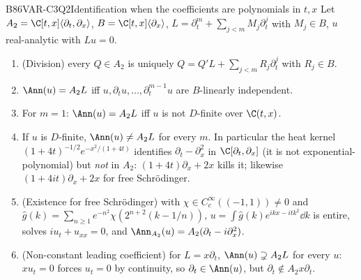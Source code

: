 \begin{dimcard}{B86}{VAR-C3Q2}{Identification when the coefficients are polynomials in $t,x$}{\proved}{}
Let $A_2=\C[t,x]\langle\partial_t,\partial_x\rangle$, $B=\C[t,x]\langle\partial_x\rangle$, $L=\partial_t^m+\sum_{j<m}M_j\partial_t^j$ with $M_j\in B$, $u$ real-analytic with $Lu=0$.
\begin{enumerate}[label=(\alph*)]
\item (Division) every $Q\in A_2$ is uniquely $Q=Q'L+\sum_{j<m}R_j\partial_t^j$ with $R_j\in B$.
\item $\Ann(u)=A_2L$ iff $u,\partial_tu,\dots,\partial_t^{m-1}u$ are $B$-linearly independent.
\item For $m=1$: $\Ann(u)=A_2L$ iff $u$ is not $D$-finite over $\C(t,x)$.
\item If $u$ is $D$-finite, $\Ann(u)\ne A_2L$ for every $m$. In particular the heat kernel $(1+4t)^{-1/2}e^{-x^2/(1+4t)}$ identifies $\partial_t-\partial_x^2$ in $\C[\partial_t,\partial_x]$ (it is not exponential-polynomial) but \emph{not} in $A_2$: $(1+4t)\partial_x+2x$ kills it; likewise $(1+4it)\partial_x+2x$ for free Schr\"odinger.
\item (Existence for free Schr\"odinger) with $\chi\in C_c^\infty((-1,1))\ne0$ and $\hat g(k)=\sum_{n\ge1}e^{-n^2}\chi(2^{n+2}(k-1/n))$, $u=\int\hat g(k)e^{ikx-itk^2}\dd k$ is entire, solves $iu_t+u_{xx}=0$, and $\Ann_{A_2}(u)=A_2(\partial_t-i\partial_x^2)$.
\item (Non-constant leading coefficient) for $L=x\partial_t$, $\Ann(u)\supsetneq A_2L$ for every $u$: $xu_t=0$ forces $u_t=0$ by continuity, so $\partial_t\in\Ann(u)$, but $\partial_t\notin A_2x\partial_t$.
\end{enumerate}
\end{dimcard}

